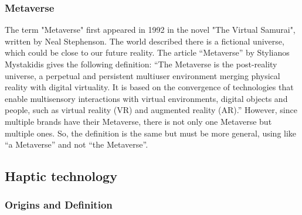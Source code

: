 \documentclass[12pt, a4paper]{article}
\begin{document}
\begin{multicols}{2}
\subsubsection{Metaverse}

\par The term "Metaverse" first appeared in 1992 in the novel "The Virtual Samurai", written by Neal Stephenson. The world described there is a fictional universe, which could be close to our future reality\cite{metaverse2}. The article “Metaverse” by Stylianos Mystakidis gives the following definition: “The Metaverse is the post-reality universe, a perpetual and persistent multiuser environment merging physical reality with digital virtuality. It is based on the convergence of technologies that enable multisensory interactions with virtual environments, digital objects and people, such as virtual reality (VR) and augmented reality (AR).” However, since multiple brands have their Metaverse, there is not only one Metaverse but multiple ones. So, the definition is the same but must be more general, using like “a Metaverse” and not “the Metaverse”.\cite{metaverse2}\cite{metaverse}

\subsection{Haptic technology}

\subsubsection{Origins and Definition}


\end{multicols}
\end{document}
